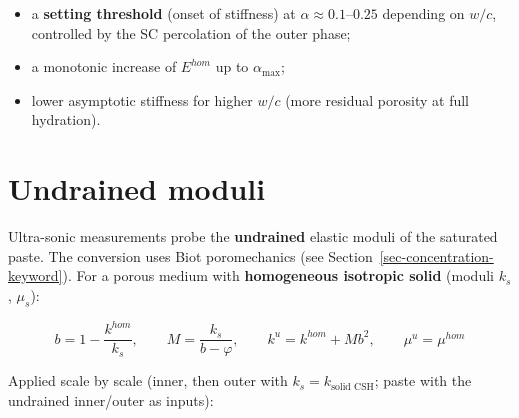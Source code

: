 \documentclass[
  a4paper,
  numbers=noendperiod,
  DIV=12]{scrreprt}
\providecommand{\tightlist}{%
  \setlength{\itemsep}{0pt}\setlength{\parskip}{0pt}}
\begin{document}
\begin{itemize}
\tightlist
\item
  a \textbf{setting threshold} (onset of stiffness) at
  \(\alpha \approx 0.1\)--\(0.25\) depending on \(w/c\), controlled by
  the SC percolation of the outer phase;
\item
  a monotonic increase of \(E^{hom}\) up to \(\alpha_{\max}\);
\item
  lower asymptotic stiffness for higher \(w/c\) (more residual porosity
  at full hydration).
\end{itemize}

\section{Undrained moduli}\label{sec-sanahuja-undrained}

Ultra-sonic measurements probe the \textbf{undrained} elastic moduli of
the saturated paste. The conversion uses Biot poromechanics (see
Section~\ref{sec-concentration-keyword}). For a porous medium with
\textbf{homogeneous isotropic solid} (moduli \(k_s\), \(\mu_s\)):

\[
b = 1 - \frac{k^{hom}}{k_s}, \qquad
M = \frac{k_s}{b - \varphi}, \qquad
k^u = k^{hom} + M b^2, \qquad
\mu^u = \mu^{hom}
\]

Applied scale by scale (inner, then outer with
\(k_s = k_\text{solid CSH}\); paste with the undrained inner/outer as
inputs):
\end{document}
